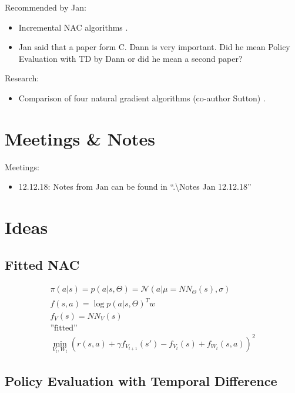 \noindent Recommended by Jan:
\begin{itemize}
	\item Incremental NAC algorithms \cite{bhatnagar2008incremental}.
	\item Jan said that a paper form C. Dann is very important. Did he mean Policy Evaluation with TD by Dann or did he mean a second paper?
\end{itemize}

\noindent Research:
\begin{itemize}
	\item Comparison of four natural gradient algorithms (co-author Sutton) \cite{bhatnagar2009natural}.
\end{itemize}

\section{Meetings \& Notes}

Meetings:
\begin{itemize}
	\item 12.12.18: Notes from Jan can be found in ``.\textbackslash Notes Jan 12.12.18''
\end{itemize}


\section{Ideas}
\subsection{Fitted NAC}

\begin{align}
	\pi(a|s) = p(a|s, \Theta) = \mathcal{N}(a|\mu = NN_{\Theta}(s), \sigma) \\
	f(s,a) = \log p(a|s, \Theta)^T w \\
	f_V(s) = NN_V(s) \\
	\text{''fitted''}\\
	\min_{V_t, W_t} (r(s,a) + \gamma f_{V_{t+1}}(s') - f_{V_t}(s) + f_{W_t}(s,a))^2
\end{align}

\subsection{Policy Evaluation with Temporal Difference}
\cite{dann2014policy}


